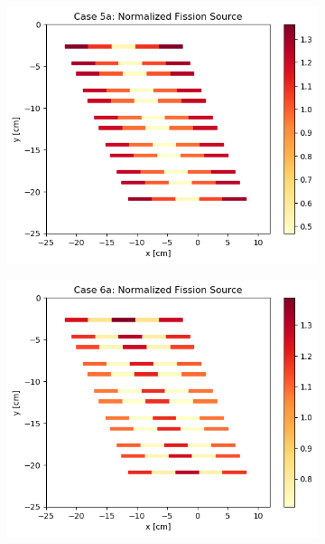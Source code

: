 \documentclass[letterpaper,11pt]{report}
\begin{document}
\begin{figure}[H]
\begin{subfigure}{.33\textwidth}
        \centering
        \includegraphics[width=\linewidth]{../../phase1a/case5a/analysis_output/p1a_5a_c.png}
        \caption{}
      \end{subfigure}
      \begin{subfigure}{.33\textwidth}
        \centering
        \includegraphics[width=\linewidth]{../../phase1a/case6a/analysis_output/p1a_6a_c.png}
        \caption{}
      \end{subfigure}
      \begin{subfigure}{.32\textwidth}
        \centering

\end{subfigure}
\end{figure}
\end{document}
